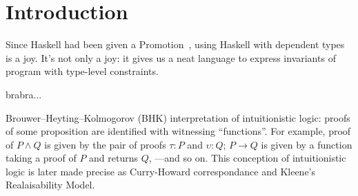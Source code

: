 \documentclass[demotion-paper.tex]{subfiles}
\begin{document}
\section{Introduction}
Since Haskell had been given a Promotion~\cite{Yorgey:2012}, using Haskell with dependent types is a joy.
It's not only a joy: it gives us a neat language to express invariants of program with type-level constraints.

brabra...

Brouwer--Heyting--Kolmogorov (BHK) interpretation of intuitionistic logic: proofs of some proposition are identified with witnessing ``functions''.
For example, proof of $P \land Q$ is given by the pair of proofs $\tau: P$ and $\upsilon: Q$; $P \to Q$ is given by a function taking a proof of $P$ and returns $Q$, ---and so on.
This conception of intuitionistic logic is later made precise as Curry-Howard correspondance and Kleene's Realaisability Model.
\end{document}
